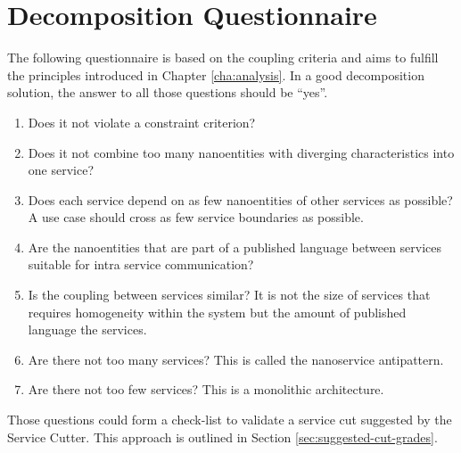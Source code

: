 
\section{Decomposition Questionnaire}
\label{sec:decompositionRequirements}

The following questionnaire is based on the coupling criteria and aims to fulfill the principles introduced in Chapter \ref{cha:analysis}. In a good decomposition solution, the answer to all those questions should be \enquote{yes}.

\begin{enumerate} %
	\item Does it not violate a constraint criterion?
	\item Does it not combine too many nanoentities with diverging characteristics into one service?
	\item Does each service depend on as few nanoentities of other services as possible? A use case should cross as few service boundaries as possible. %
	\item Are the nanoentities that are part of a published language between services suitable for intra service communication?
	\item Is the coupling between services similar? It is not the size of services that requires homogeneity within the system but the amount of published language the services. 
	\item Are there not too many services? This is called the nanoservice antipattern\cite{nanoservice}.
	\item Are there not too few services? This is a monolithic architecture.
\end{enumerate}

Those questions could form a check-list to validate a service cut suggested by the Service Cutter. This approach is outlined in Section \ref{sec:suggested-cut-grades}.




